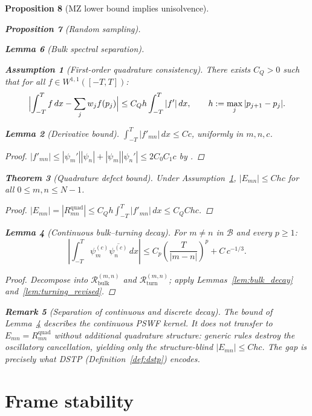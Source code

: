 \documentclass[12pt,a4paper]{amsart}
\newtheorem{theorem}{Theorem}[section]
\newtheorem{lemma}[theorem]{Lemma}
\newtheorem{proposition}[theorem]{Proposition}
\theoremstyle{definition}
\newtheorem{remark}[theorem]{Remark}
\newtheorem{assumption}[theorem]{Assumption}
\newcommand{\Rbulk}{\mathcal{R}_{\mathrm{bulk}}}
\newcommand{\Rturning}{\mathcal{R}_{\mathrm{turn}}}
\begin{document}
\begin{proposition}[MZ lower bound implies unisolvence]
\begin{proposition}[Random sampling]
\begin{lemma}[Bulk spectral separation]
\begin{assumption}[First-order quadrature consistency]%
\label{ass:quad_first_order}
There exists $C_Q>0$ such that for all $f\in W^{1,1}([-T,T])$:
\[
  \Bigl|\int_{-T}^T f\,dx-\sum_j w_j f(p_j)\Bigr|
  \le C_Q h\int_{-T}^T|f'|\,dx,
  \qquad h:=\max_j|p_{j+1}-p_j|.
\]
\end{assumption}

\begin{lemma}[Derivative bound]\label{lem:derivative_bound}
$\int_{-T}^T|f'_{mn}|\,dx\le Cc$, uniformly in $m,n,c$.
\end{lemma}
\begin{proof}
$|f'_{mn}|\le|\psi_m'||\psi_n|+|\psi_m||\psi_n'|\le 2C_0C_1 c$
by \cite{BonamiKaroui2014}.
\end{proof}

\begin{theorem}[Quadrature defect bound]\label{thm:banded_decay}
Under Assumption~\ref{ass:quad_first_order},
$|E_{mn}|\le Chc$ for all $0\le m,n\le N-1$.
\end{theorem}
\begin{proof}
$|E_{mn}|=|R_{mn}^{\mathrm{quad}}|
\le C_Q h\int_{-T}^T|f'_{mn}|\,dx\le C_QChc$.
\end{proof}

\begin{lemma}[Continuous bulk--turning decay]%
\label{lem:bulk_decay_continuous}
For $m\ne n$ in $\mathcal{B}$ and every $p\ge 1$:
\[
  \left|\int_{-T}^T\psi_m^{(c)}\overline{\psi_n^{(c)}}\,dx\right|
  \le C_p\left(\frac{T}{|m-n|}\right)^p+C\,c^{-1/3}.
\]
\end{lemma}
\begin{proof}
Decompose into $\Rbulk^{(m,n)}$ and $\Rturning^{(m,n)}$; apply
Lemmas~\ref{lem:bulk_decay} and~\ref{lem:turning_revised}.
\end{proof}

\begin{remark}[Separation of continuous and discrete decay]
The bound of Lemma~\ref{lem:bulk_decay_continuous} describes
the \emph{continuous} PSWF kernel. It does not transfer to
$E_{mn}=R_{mn}^{\mathrm{quad}}$ without additional quadrature
structure: generic rules destroy the oscillatory cancellation,
yielding only the structure-blind $|E_{mn}|\le Chc$. The gap is
precisely what DSTP (Definition~\ref{def:dstp}) encodes.
\end{remark}

\section{Frame stability}\label{sec:stability}


\end{lemma}
\end{proposition}
\end{proposition}
\end{document}
